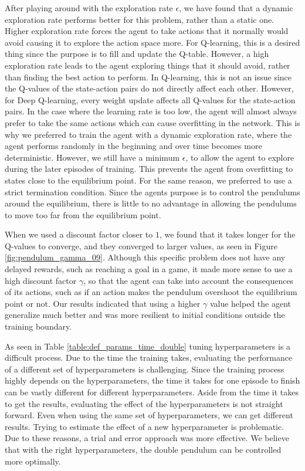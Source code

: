 \documentclass[final]{LTHtwocol} %
\begin{document}
After playing around with the exploration rate $\epsilon$, we have found that a dynamic exploration rate performs better for this problem, rather than a static one.
Higher exploration rate forces the agent to take actions that it normally would avoid causing it to explore the action space more.
For Q-learning, this is a desired thing since the purpose is to fill and update the Q-table.
However, a high exploration rate leads to the agent exploring things that it should avoid, rather than finding the best action to perform.
In Q-learning, this is not an issue since the Q-values of the state-action pairs do not directly affect each other.
However, for Deep Q-learning, every weight update affects all Q-values for the state-action pairs.
In the case where the learning rate is too low, the agent will almost always prefer to take the same actions which can cause overfitting in the network.
This is why we preferred to train the agent with a dynamic exploration rate, where the agent performs randomly in the beginning and over time becomes more deterministic.
However, we still have a minimum $\epsilon$, to allow the agent to explore during the later episodes of training.
This prevents the agent from overfitting to states close to the equilibrium point.
For the same reason, we preferred to use a strict termination condition. 
Since the agents purpose is to control the pendulums around the equilibrium, there is little to no advantage in allowing the pendulums to move too far from the equilibrium point.

When we used a discount factor closer to $1$, we found that it takes longer for the Q-values to converge, and they converged to larger values, as seen in Figure \ref{fig:pendulum_gamma_09}.
Although this specific problem does not have any delayed rewards, such as reaching a goal in a game, it made more sense to use a high discount factor $\gamma$, so that the agent can take into account the consequences of its actions, such as if an action makes the pendulum overshoot the equilibrium point or not.
Our results indicated that using a higher $\gamma$ value helped the agent generalize much better and was more resilient to initial conditions outside the training boundary.

As seen in Table \ref{table:def_params_time_double} tuning hyperparameters is a difficult process. 
Due to the time the training takes, evaluating the performance of a different set of hyperparameters is challenging.
Since the training process highly depends on the hyperparameters, the time it takes for one episode to finish can be vastly different for different hyperparameters.
Aside from the time it takes to get the results, evaluating the effect of the hyperparameters is not straight forward.
Even when using the same set of hyperparameters, we can get different results.
Trying to estimate the effect of a new hyperparameter is problematic.
Due to these reasons, a trial and error approach was more effective.
We believe that with the right hyperparameters, the double pendulum can be controlled more optimally.
\end{document}
